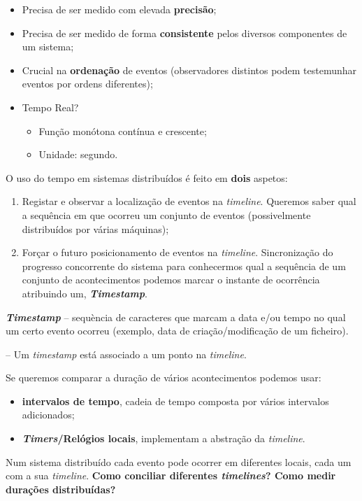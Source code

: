 \documentclass{article}
\begin{document}
\begin{itemize}
	\item Precisa de ser medido com elevada \textbf{precisão};
	\item Precisa de ser medido de forma \textbf{consistente} pelos diversos componentes de um sistema;
	\item Crucial na \textbf{ordenação} de eventos (observadores distintos podem testemunhar eventos por ordens diferentes);
	\item Tempo Real?
		\begin{itemize}
			\item Função monótona contínua e crescente;
			\item Unidade: segundo.
		\end{itemize}
\end{itemize}

O uso do tempo em sistemas distribuídos é feito em \textbf{dois} aspetos:

\begin{enumerate}
	\item Registar e observar a localização de eventos na \textit{timeline}. Queremos saber qual a sequência em que ocorreu um conjunto de eventos (possivelmente distribuídos por várias máquinas);
	\item Forçar o futuro posicionamento de eventos na \textit{timeline}. Sincronização do progresso concorrente do sistema para conhecermos qual a sequência de um conjunto de acontecimentos podemos marcar o instante de ocorrência atribuindo um, \textbf{\textit{Timestamp}}.
\end{enumerate}

\textit{\textbf{Timestamp}} -- sequència de caracteres que marcam a data e/ou tempo no qual um certo evento ocorreu (exemplo, data de criação/modificação de um ficheiro).

-- Um \textit{timestamp} está associado a um ponto na \textit{timeline}.

Se queremos comparar a duração de vários acontecimentos podemos usar:
\begin{itemize}
	\item \textbf{intervalos de tempo}, cadeia de tempo composta por vários intervalos adicionados;
	\item \textbf{\textit{Timers}/Relógios locais}, implementam a abstração da \textit{timeline}.
\end{itemize}

Num sistema distribuído cada evento pode ocorrer em diferentes locais, cada um com a sua \textit{timeline}. \textbf{Como conciliar diferentes \textit{timelines}? Como medir durações distribuídas?}
\end{document}
